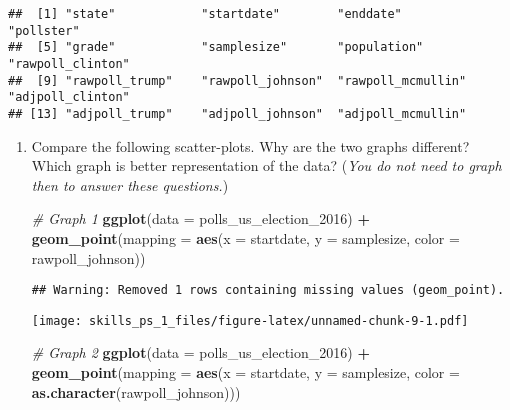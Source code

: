 \documentclass[
]{article}
\newenvironment{Shaded}{\begin{snugshade}}{\end{snugshade}}
\newcommand{\CommentTok}[1]{\textcolor[rgb]{0.56,0.35,0.01}{\textit{#1}}}
\newcommand{\DataTypeTok}[1]{\textcolor[rgb]{0.13,0.29,0.53}{#1}}
\newcommand{\DecValTok}[1]{\textcolor[rgb]{0.00,0.00,0.81}{#1}}
\newcommand{\KeywordTok}[1]{\textcolor[rgb]{0.13,0.29,0.53}{\textbf{#1}}}
\newcommand{\NormalTok}[1]{#1}
\newcommand{\OperatorTok}[1]{\textcolor[rgb]{0.81,0.36,0.00}{\textbf{#1}}}
\newcommand{\StringTok}[1]{\textcolor[rgb]{0.31,0.60,0.02}{#1}}
\begin{document}
\begin{verbatim}
##  [1] "state"            "startdate"        "enddate"          "pollster"        
##  [5] "grade"            "samplesize"       "population"       "rawpoll_clinton" 
##  [9] "rawpoll_trump"    "rawpoll_johnson"  "rawpoll_mcmullin" "adjpoll_clinton" 
## [13] "adjpoll_trump"    "adjpoll_johnson"  "adjpoll_mcmullin"
\end{verbatim}

\begin{enumerate}
\def\labelenumi{\arabic{enumi}.}
\item
  Compare the following scatter-plots. Why are the two graphs different?
  Which graph is better representation of the data?
  (\textit{You do not need to graph then to answer these questions.})

\begin{Shaded}
\begin{Highlighting}[]
\CommentTok{# Graph 1}
\KeywordTok{ggplot}\NormalTok{(}\DataTypeTok{data =}\NormalTok{ polls_us_election_}\DecValTok{2016}\NormalTok{) }\OperatorTok{+}
\StringTok{  }\KeywordTok{geom_point}\NormalTok{(}\DataTypeTok{mapping =} \KeywordTok{aes}\NormalTok{(}\DataTypeTok{x =}\NormalTok{ startdate, }
                           \DataTypeTok{y =}\NormalTok{ samplesize, }
                           \DataTypeTok{color =}\NormalTok{ rawpoll_johnson)) }
\end{Highlighting}
\end{Shaded}

\begin{verbatim}
## Warning: Removed 1 rows containing missing values (geom_point).
\end{verbatim}

  \texttt{[image: skills\_ps\_1\_files/figure-latex/unnamed-chunk-9-1.pdf]}

\begin{Shaded}
\begin{Highlighting}[]
\CommentTok{# Graph 2}
\KeywordTok{ggplot}\NormalTok{(}\DataTypeTok{data =}\NormalTok{ polls_us_election_}\DecValTok{2016}\NormalTok{) }\OperatorTok{+}
\StringTok{  }\KeywordTok{geom_point}\NormalTok{(}\DataTypeTok{mapping =} \KeywordTok{aes}\NormalTok{(}\DataTypeTok{x =}\NormalTok{ startdate, }
                           \DataTypeTok{y =}\NormalTok{ samplesize, }
                           \DataTypeTok{color =} \KeywordTok{as.character}\NormalTok{(rawpoll_johnson)))}
\end{Highlighting}
\end{Shaded}


\end{enumerate}
\end{document}
